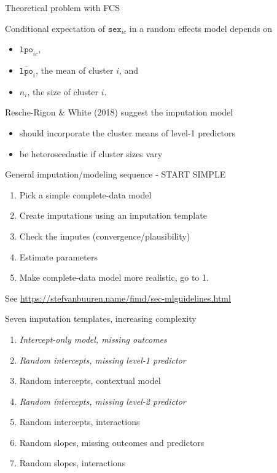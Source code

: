 \documentclass[ignorenonframetext,aspectratio=43]{beamer}
\providecommand{\tightlist}{%
  \setlength{\itemsep}{0pt}\setlength{\parskip}{0pt}}
\begin{document}
\begin{frame}{Theoretical problem with FCS}

Conditional expectation of \(\texttt{sex}_{ic}\) in a random effects
model depends on

\begin{itemize}
\tightlist
\item
  \(\texttt{lpo}_{ic}\),
\item
  \(\overline{\texttt{lpo}}_{i}\), the mean of cluster \(i\), and
\item
  \(n_i\), the size of cluster \(i\).
\end{itemize}

Resche-Rigon \& White (2018) suggest the imputation model

\begin{itemize}
\tightlist
\item
  should incorporate the cluster means of level-1 predictors
\item
  be heteroscedastic if cluster sizes vary
\end{itemize}

\end{frame}

\begin{frame}{General imputation/modeling sequence - START SIMPLE}

\begin{enumerate}
\def\labelenumi{\arabic{enumi}.}
\tightlist
\item
  Pick a simple complete-data model
\item
  Create imputations using an imputation template
\item
  Check the imputes (convergence/plausibility)
\item
  Estimate parameters
\item
  Make complete-data model more realistic, go to 1.
\end{enumerate}

See \url{https://stefvanbuuren.name/fimd/sec-mlguidelines.html}

\end{frame}

\begin{frame}{Seven imputation templates, increasing complexity}

\begin{enumerate}
\def\labelenumi{\arabic{enumi}.}
\tightlist
\item
  \emph{Intercept-only model, missing outcomes}
\item
  \emph{Random intercepts, missing level-1 predictor}
\item
  Random intercepts, contextual model
\item
  \emph{Random intercepts, missing level-2 predictor}
\item
  Random intercepts, interactions
\item
  Random slopes, missing outcomes and predictors
\item
  Random slopes, interactions
\end{enumerate}

\end{frame}
\end{document}
